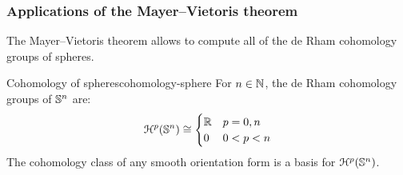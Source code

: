 \subsubsection{Applications of the Mayer--Vietoris theorem}

The Mayer--Vietoris theorem allows to compute all of the de Rham cohomology groups of spheres.

\begin{proposition}{Cohomology of spheres}{cohomology-sphere}
  For $ n \in \mathbb{N} $, the de Rham cohomology groups of $ \mathbb{S}^{n} $ are:
  \begin{equation}
    \EuScript{H}^{p}(\mathbb{S}^{n}) \cong
    \begin{cases}
      \mathbb{R} & p = 0,n \\
      0 & 0 < p < n
    \end{cases}
  \end{equation}
  The cohomology class of any smooth orientation form is a basis for $ \EuScript{H}^{p}(\mathbb{S}^{n}) $.
\end{proposition}

